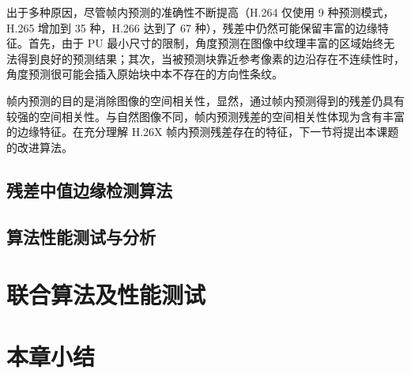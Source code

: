 出于多种原因，尽管帧内预测的准确性不断提高（H.264 仅使用 9 种预测模式，H.265 增加到 35 种，H.266 达到了 67 种），残差中仍然可能保留丰富的边缘特征。首先，由于 PU 最小尺寸的限制，角度预测在图像中纹理丰富的区域始终无法得到良好的预测结果；其次，当被预测块靠近参考像素的边沿存在不连续性时，角度预测很可能会插入原始块中本不存在的方向性条纹。

帧内预测的目的是消除图像的空间相关性，显然，通过帧内预测得到的残差仍具有较强的空间相关性。与自然图像不同，帧内预测残差的空间相关性体现为含有丰富的边缘特征。在充分理解 H.26X 帧内预测残差存在的特征，下一节将提出本课题的改进算法。

\subsection{残差中值边缘检测算法}

\subsection{算法性能测试与分析}


\section{联合算法及性能测试}

\section{本章小结}